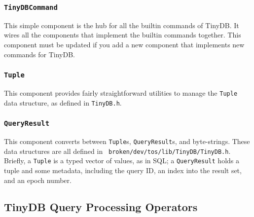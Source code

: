 \documentclass[11pt]{article}
\newcommand{\docroot}{broken/dev}
\begin{document}
\subsubsection {\tt TinyDBCommand}
\label{sec:attr}
This simple component is the hub for all the
builtin commands of TinyDB.  It wires all the components that
implement the builtin commands together.  This component
must be updated if you add a new component that implements
new commands for TinyDB.


\subsubsection{\tt Tuple}
This component provides fairly straightforward utilities to manage the
{\tt Tuple} data structure, as defined in {\tt TinyDB.h}.

\subsubsection {\tt QueryResult}
This component converts between {\tt Tuple}s, {\tt QueryResult}s,
and byte-strings.  These data structures are all defined in {\tt
\docroot/tos/lib/TinyDB/TinyDB.h}.  Briefly, a {\tt Tuple} is a typed vector
of values, as in SQL; a {\tt QueryResult} holds a tuple and some
metadata, including the query ID, an index into the result set, and an
epoch number.



\subsection{TinyDB Query Processing Operators}
\label{sec:qp}
\end{document}
